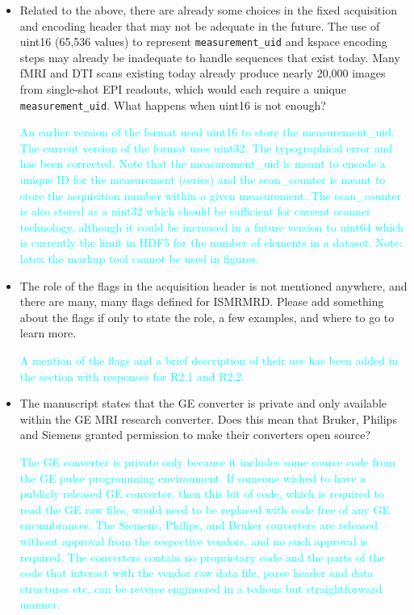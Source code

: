\documentclass[12pt, draft]{article}
\makeatletter
\def\namedlabel#1#2{\begingroup#2\def\@currentlabel{#2}\phantomsection\label{#1}\endgroup}
\newcommand{\question}[1]{\item[\namedlabel{q#1}{#1}]}
\newcommand{\response}[1]{\textcolor{cyan}{#1}}
\makeatother
\begin{document}
{\begin{itemize}
\question{R2.6} Related to the above, there are already some choices in the fixed acquisition and encoding header that may not be adequate in the future. The use of uint16 (65,536 values) to represent \texttt{measurement\_uid} and kspace encoding steps may already be inadequate to handle sequences that exist today. Many fMRI and DTI scans existing today already produce nearly 20,000 images from single-shot EPI readouts, which would each require a unique \texttt{measurement\_uid}. What happens when uint16 is not enough?

\response{An earlier version of the format used uint16 to store the measurement\_uid. The current version of the format uses uint32. The typographical error and has been corrected. Note that the measurement\_uid is meant to encode a unique ID for the measurement (series) and the scan\_counter is meant to store the acquisition number within a given measurement. The scan\_counter is also stored as a nint32 which should be sufficient for current scanner technology, although it could be increased in a future version to uint64 which is currently the limit in HDF5 for the number of elements in a dataset.   Note: latex the markup tool cannot be used in figures.}

\question{R2.7} The role of the flags in the acquisition header is not mentioned anywhere, and there are many, many flags defined for ISMRMRD. Please add something about the flags if only to state the role, a few examples, and where to go to learn more.

\response{A mention of the flags and a brief description of their use has been added in the section with responses for R2.1 and R2.2.}

\question{R2.8} The manuscript states that the GE converter is private and only available within the GE MRI research converter. Does this mean that Bruker, Philips and Siemens granted permission to make their converters open source?

\response{The GE converter is private only because it includes some source code from the GE pulse programming environment.  If someone wished to have a publicly released GE converter, then this bit of code, which is required to read the GE raw files, would need to be replaced with code free of any GE encumbrances.  The Siemens, Philips, and Bruker converters are released without approval from the respective vendors, and no such approval is required. The converters contain no proprietary code and the parts of the code that interact with the vendor raw data file, parse header and data structures etc, can be reverse engineered in a tedious but straightforward manner.}


\end{itemize}}
\end{document}
